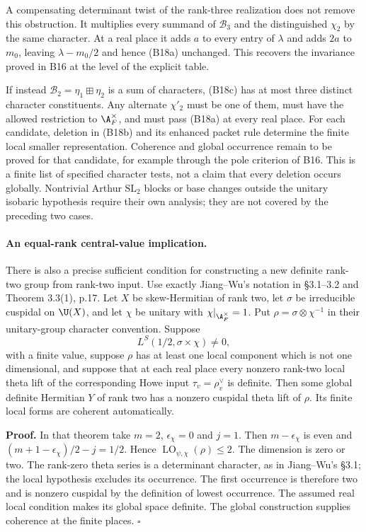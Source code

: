 \documentclass[11pt]{article}
\theoremstyle{definition}\newtheorem{definition}[theorem]{Definition}\newtheorem{remark}[theorem]{Remark}
\begin{document}
A compensating determinant twist of the rank-three realization
does not remove this obstruction. It multiplies every summand
of $\mathcal B_3$ and the distinguished $\chi_2$ by the same
character. At a real place it adds $a$ to every entry of
$\lambda$ and adds $2a$ to $m_0$, leaving
$\lambda-m_0/2$ and hence (B18a) unchanged. This recovers the
invariance proved in B16 at the level of the explicit table.

If instead $\mathcal B_2=\eta_1\boxplus\eta_2$ is a sum of
characters, (B18c) has at most three distinct character
constituents. Any alternate $\chi'_2$ must be one of them,
must have the allowed restriction to $\A_F^\times$, and must
pass (B18a) at every real place. For each candidate, deletion
in (B18b) and its enhanced packet rule determine the finite
local smaller representation. Coherence and global occurrence
remain to be proved for that candidate, for example through
the pole criterion of B16. This is a finite list of specified
character tests, not a claim that every deletion occurs globally.
Nontrivial Arthur $\mathrm{SL}_2$ blocks or base changes outside
the unitary isobaric hypothesis require their own analysis;
they are not covered by the preceding two cases.

\paragraph{An equal-rank central-value implication.}
There is also a precise sufficient condition for constructing a
new definite rank-two group from rank-two input. Use exactly
Jiang--Wu's notation in \S3.1--3.2 and Theorem 3.3(1), p.17.
Let $X$ be skew-Hermitian of rank two, let $\sigma$ be irreducible
cuspidal on $\U(X)$, and let $\chi$ be unitary with
$\chi|_{\A_F^\times}=1$.
Put $\rho=\sigma\otimes\chi^{-1}$ in their unitary-group
character convention. Suppose
\[
 L^S(1/2,\sigma\times\chi)\ne0,
 \tag{B18d}
\]
with a finite value, suppose $\rho$ has at least one local
component which is not one dimensional, and suppose that
at each real place every nonzero rank-two local theta lift
of the corresponding Howe input $\tau_v=\rho_v^\vee$ is
definite. Then some global definite
Hermitian $Y$ of rank two has a nonzero cuspidal theta lift of
$\rho$. Its finite local forms are coherent automatically.

\textbf{Proof.}
In that theorem take $m=2$, $\epsilon_\chi=0$ and $j=1$.
Then $m-\epsilon_\chi$ is even and
$(m+1-\epsilon_\chi)/2-j=1/2$. Hence
$\operatorname{LO}_{\psi,\chi}(\rho)\leq2$.
The dimension is zero or two. The rank-zero theta series is
a determinant character, as in Jiang--Wu's \S3.1; the local
hypothesis excludes its occurrence. The first occurrence is
therefore two and is nonzero cuspidal by the definition of
lowest occurrence. The assumed real local condition makes its
global space definite. The global construction supplies
coherence at the finite places. \hfill$\square$
\end{document}
